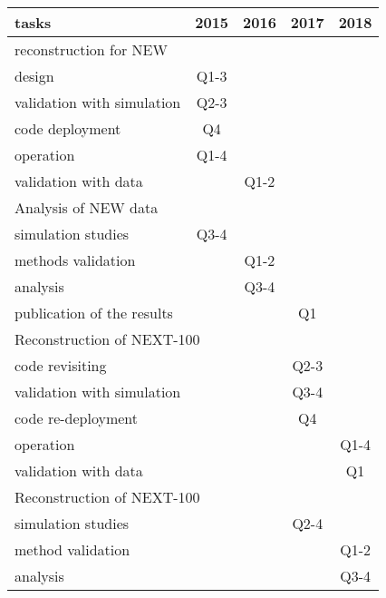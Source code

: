 \begin{center}
\begin{tabular}{| l | c | c | c | c |}
\hline
tasks & 2015 & 2016 & 2017 & 2018 \\
\hline
\hline
\multicolumn{5}{|l|}{reconstruction for NEW}  \\
\hline
\hline
design & Q1-3 & & &  \\
validation with simulation & Q2-3 & & & \\
code deployment & Q4  & & & \\
operation  & Q1-4 & & & \\
validation with data & & Q1-2 & & \\
\hline
\hline
\multicolumn{5}{|l|}{Analysis of NEW data}  \\
\hline
\hline
simulation studies & Q3-4 & & & \\
methods validation & & Q1-2 &  & \\
analysis  & & Q3-4 &  & \\
publication of the results & & & Q1 & \\
\hline
\hline
\multicolumn{5}{|l|}{Reconstruction of NEXT-100}  \\
\hline
\hline
code revisiting &  &  &  Q2-3 & \\
validation with simulation & &  & Q3-4  & \\
code re-deployment  & &  & Q4   & \\
operation & & & & Q1-4 \\
validation with data & & & & Q1 \\
\hline
\hline
\multicolumn{5}{|l|}{Reconstruction of NEXT-100}  \\
\hline
\hline
simulation studies &  &  & Q2-4 & \\
method validation &  &  & & Q1-2\\
analysis & & & &  Q3-4\\
\hline
\end{tabular}
\end{center}

